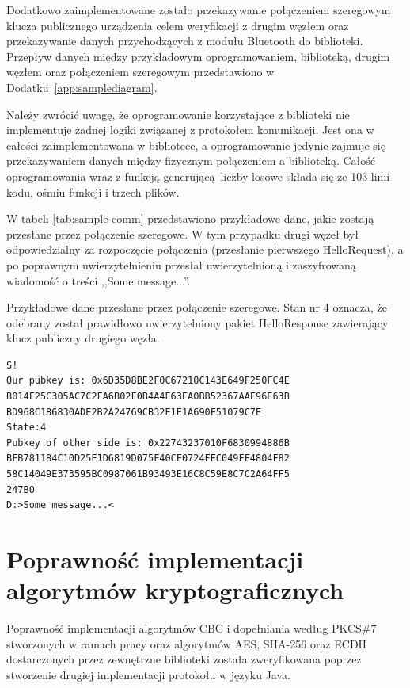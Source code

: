 Dodatkowo zaimplementowane zostało przekazywanie połączeniem szeregowym klucza publicznego urządzenia celem weryfikacji z drugim węzłem oraz przekazywanie danych przychodzących z modułu Bluetooth do biblioteki. Przepływ danych między przykładowym oprogramowaniem, biblioteką, drugim węzłem oraz połączeniem szeregowym przedstawiono w Dodatku~\ref{app:samplediagram}.

Należy zwrócić uwagę, że oprogramowanie korzystające z biblioteki nie implementuje żadnej logiki związanej z protokołem komunikacji. Jest ona w całości zaimplementowana w bibliotece, a oprogramowanie jedynie zajmuje się przekazywaniem danych między fizycznym połączeniem a biblioteką. Całość oprogramowania wraz z funkcją generującą liczby losowe składa się ze 103 linii kodu, ośmiu funkcji i trzech plików.

W tabeli \ref{tab:sample-comm} przedstawiono przykładowe dane, jakie zostają przesłane przez połączenie szeregowe. W tym przypadku drugi węzeł był odpowiedzialny za rozpoczęcie połączenia (przesłanie pierwszego HelloRequest), a po poprawnym uwierzytelnieniu przesłał uwierzytelnioną i zaszyfrowaną wiadomość o treści ,,Some message...''.

\begin{table}
\centering
\caption{Przykładowe dane przesłane przez połączenie szeregowe. Stan nr 4 oznacza, że odebrany został prawidłowo uwierzytelniony pakiet HelloResponse zawierający klucz publiczny drugiego węzła.}
\begin{BVerbatim}
S!
Our pubkey is: 0x6D35D8BE2F0C67210C143E649F250FC4E
B014F25C305AC7C2FA6B02F0B4A4E63EA0BB52367AAF96E63B
BD968C186830ADE2B2A24769CB32E1E1A690F51079C7E
State:4
Pubkey of other side is: 0x22743237010F6830994886B
BFB781184C10D25E1D6819D075F40CF0724FEC049FF4804F82
58C14049E373595BC0987061B93493E16C8C59E8C7C2A64FF5
247B0
D:>Some message...<
\end{BVerbatim}
\label{tab:sample-comm}
\end{table}

\section{Poprawność implementacji algorytmów kryptograficznych}

Poprawność implementacji algorytmów CBC i dopełniania według PKCS\#7 stworzonych w ramach pracy oraz algorytmów AES, SHA-256 oraz ECDH dostarczonych przez zewnętrzne biblioteki została zweryfikowana poprzez stworzenie drugiej implementacji protokołu w języku Java.

